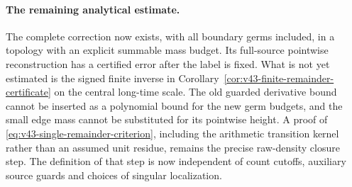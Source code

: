 \paragraph{The remaining analytical estimate.}
The complete correction now exists, with all boundary germs included,
in a topology with an explicit summable mass budget. Its full-source
pointwise reconstruction has a certified error after the label is
fixed. What is not yet estimated is the signed finite inverse in
Corollary~\ref{cor:v43-finite-remainder-certificate} on the central
long-time scale. The old guarded derivative bound cannot be inserted
as a polynomial bound for the new germ budgets, and the small edge
mass cannot be substituted for its pointwise height. A proof of
\eqref{eq:v43-single-remainder-criterion}, including the arithmetic
transition kernel rather than an assumed unit residue, remains the
precise raw-density closure step. The definition of that step is now
independent of count cutoffs, auxiliary source guards and choices of
singular localization.
